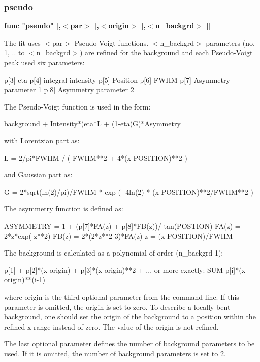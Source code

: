 \subsubsection{pseudo}
{\bf func "pseudo" [,$ <$par$> $ [,$ <$origin$> $ [,$ <$n\_backgrd$> $ ]] \par }
\par
\vspace{3pt}
The fit uses $ <$par$> $ Pseudo-Voigt functions. $ <$n\_backgrd$> $ parameters 
(no. 1, .. to $ <$n\_backgrd$> $) are refined for the background and each 
Pseudo-Voigt peak used six parameters: 
\par
\begin{MacVerbatim}
p[3] eta
p[4] integral intensity
p[5] Position
p[6] FWHM
p[7] Asymmetry parameter 1
p[8] Asymmetry parameter 2
\end{MacVerbatim}
The Pseudo-Voigt function is used in the form: 
\par
\begin{MacVerbatim}
background + Intensity*(eta*L + (1-eta)G)*Asymmetry
\end{MacVerbatim}
with Lorentzian part as: 
\begin{MacVerbatim}
L = 2/pi*FWHM / ( FWHM**2 + 4*(x-POSITION)**2 )
\end{MacVerbatim}
and Gaussian part as: 
\begin{MacVerbatim}
G = 2*sqrt(ln(2)/pi)/FWHM * exp ( -4ln(2) * (x-POSITION)**2/FWHM**2 )
\end{MacVerbatim}
The asymmetry function is defined as: 
\par
\begin{MacVerbatim}
ASYMMETRY = 1 + (p[7]*FA(z) + p[8]*FB(z))/ tan(POSTION)
FA(z) = 2*z*exp(-z**2)
FB(z) = 2*(2*z**2-3)*FA(z)
z = (x-POSITION)/FWHM
\end{MacVerbatim}
The background is calculated as a polynomial of order 
(n\_backgrd-1): 
\par
\begin{MacVerbatim}
p[1] + p[2]*(x-origin) + p[3]*(x-origin)**2 + ...
or more exactly:
SUM p[i]*(x-origin)**(i-1)
\end{MacVerbatim}
where origin is the third optional parameter from the command 
line. If this parameter is omitted, the origin is set to zero. 
To describe a locally bent background, one should set the 
origin of the background to a position within the refined 
x-range instead of zero. The value of the origin is not refined. 
\par
The last optional parameter defines the number of background 
parameters to be used. If it is omitted, the number of 
background parameters is set to 2. 
